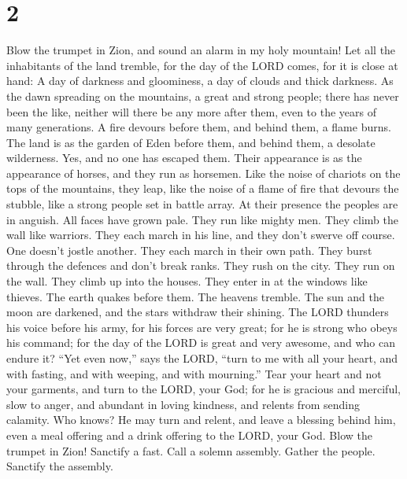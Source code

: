 \hypertarget{section-1}{%
\section{2}\label{section-1}}

 Blow the trumpet in Zion, and sound an alarm in my holy
mountain! Let all the inhabitants of the land tremble, for the day of
the LORD comes, for it is close at hand:  A day of darkness
and gloominess, a day of clouds and thick darkness. As the dawn
spreading on the mountains, a great and strong people; there has never
been the like, neither will there be any more after them, even to the
years of many generations.  A fire devours before them, and
behind them, a flame burns. The land is as the garden of Eden before
them, and behind them, a desolate wilderness. Yes, and no one has
escaped them.  Their appearance is as the appearance of
horses, and they run as horsemen.  Like the noise of
chariots on the tops of the mountains, they leap, like the noise of a
flame of fire that devours the stubble, like a strong people set in
battle array.  At their presence the peoples are in anguish.
All faces have grown pale.  They run like mighty men. They
climb the wall like warriors. They each march in his line, and they
don't swerve off course.  One doesn't jostle another. They
each march in their own path. They burst through the defences and don't
break ranks.  They rush on the city. They run on the wall.
They climb up into the houses. They enter in at the windows like
thieves.  The earth quakes before them. The heavens
tremble. The sun and the moon are darkened, and the stars withdraw their
shining.  The LORD thunders his voice before his army, for
his forces are very great; for he is strong who obeys his command; for
the day of the LORD is great and very awesome, and who can endure it?
 ``Yet even now,'' says the LORD, ``turn to me with all
your heart, and with fasting, and with weeping, and with mourning.''
 Tear your heart and not your garments, and turn to the
LORD, your God; for he is gracious and merciful, slow to anger, and
abundant in loving kindness, and relents from sending calamity.
 Who knows? He may turn and relent, and leave a blessing
behind him, even a meal offering and a drink offering to the LORD, your
God.  Blow the trumpet in Zion! Sanctify a fast. Call a
solemn assembly.  Gather the people. Sanctify the assembly.
